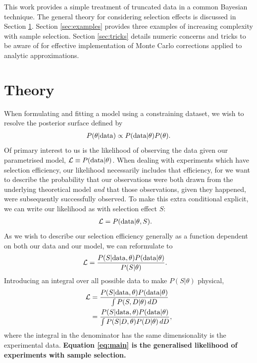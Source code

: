 \documentclass[a4paper,fleqn,usenatbib]{mnras}
\begin{document}
This work provides a simple treatment of truncated data in a common Bayesian technique. The general theory for considering selection effects is discussed in Section \ref{sec:theory}. Section \ref{sec:examples} provides three examples of increasing complexity with sample selection. Section \ref{sec:tricks} details numeric concerns and tricks to be aware of for effective implementation of Monte Carlo corrections applied to analytic approximations.






\section{Theory}
\label{sec:theory}

When formulating and fitting a model using a constraining dataset, we wish to resolve the posterior surface defined by
\begin{align}
P(\theta | {\rm data}) \propto P({\rm data} | \theta) P(\theta).
\end{align}
Of primary interest to us is the likelihood of observing the data given our parametrised model, $\mathcal{L} \equiv P({\rm data} | \theta)$. When dealing with experiments which have selection efficiency, our likelihood necessarily includes that efficiency, for we want to describe the probability that our observations were both drawn from the underlying theoretical model \textit{and} that those observations, given they happened, were subsequently successfully observed.  To make this extra conditional explicit, we can write our likelihood as
with selection effect $S$:
\begin{align}
\mathcal{L} &= P({\rm data} | \theta, S). \label{eq:like}
\end{align}
As we wish to describe our selection efficiency generally as a function dependent on both our data and our model, we can reformulate to
\begin{align}
\mathcal{L}&= \frac{P(S|{\rm data},\theta) P({\rm data}|\theta)}{P(S|\theta)}.
\end{align}
Introducing an integral over all possible data to make $P(S|\theta)$ physical,
\begin{align}
\mathcal{L}&= \frac{P(S|{\rm data},\theta) P({\rm data}|\theta)}{\int P(S, D|\theta)\, dD} \\
&= \frac{P(S|{\rm data},\theta) P({\rm data}|\theta)}{\int P(S | D, \theta) P(D|\theta)\, dD}, \label{eq:main}
\end{align}
where the integral in the denominator has the same dimensionality is the experimental data. \textbf{Equation \ref{eq:main} is the generalised likelihood of experiments with sample selection.}
\end{document}
